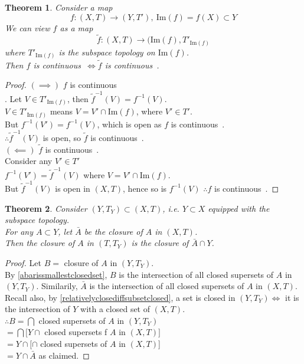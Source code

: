 \documentclass{article}
\newcommand{\cts}{continuous\ }
\newcommand{\im}[1]{\mathrm{Im}\left(#1\right)}
\newtheorem{stheorem}{Theorem}[theorem]
\theoremstyle{remark}
\theoremstyle{example}
\theoremstyle{examples}
\begin{document}
	\begin{stheorem}
		Consider a map \[f:(X,T) \to (Y,T'),\ \im f = f(X) \subset Y \]
		We can view $f$ as a map \[\tilde{f}:(X,T) \to (\im{f}, T'_{\im{f}}\] where $T'_{\im{f}}$ is the subspace topology on $\im{f}$.\\
		Then $f$ is \cts $\iff \tilde{f}$ is \cts.
	\end{stheorem}
	\begin{proof}
		$(\implies)$ $f$ is \cts\\.
		Let $V \in T'_{\im{f}}$, then $\tilde{f}^{-1}(V) = f^{-1}(V)$.\\
		$V \in T'_{\im{f}}$ means $V=V' \cap \im{f}$, where $V' \in T'$.\\
		But $f^{-1}(V')=f^{-1}(V)$, which is open as $f$ is \cts.\\
		$\therefore \tilde{f}^{-1}(V)$ is open, so $\tilde{f}$ is \cts.\\
		$(\impliedby)$ $\tilde{f}$ is \cts.\\
		Consider any $V' \in T'$\\
		$f^{-1}(V')=\tilde{f}^{-1}(V)$ where $V=V' \cap \im{f}$.\\
		But $\tilde{f}^{-1}(V)$ is open in $(X,T)$, hence so is $f^{-1}(V)$ $\therefore f$ is \cts.
	\end{proof}

	\begin{stheorem}
		Consider $(Y,T_Y) \subset (X,T)$, i.e. $Y \subset X$ equipped with the subspace topology.\\
		For any $A \subset Y$, let $\bar{A}$ be the closure of $A$ in $(X,T)$.\\
		Then the closure of $A$ in $(T,T_Y)$ is the closure of $\bar{A} \cap Y$.
	\end{stheorem}
	\begin{proof}
		Let $B=$ closure of $A$ in $(Y,T_Y)$.\\
		By \ref{abarissmallestclosedset}, $B$ is the intersection of all closed supersets of $A$ in $(Y,T_Y)$. Similarily, $\bar{A}$ is the intersection of all closed supersets of $A$ in $(X,T)$.\\
		Recall also, by \ref{relativelyclosediffsubsetclosed}, a set is closed in $(Y,T_Y) \iff$ it is the intersection of $Y$ with a closed set of $(X,T)$.\\
		$\therefore B = \bigcap$ closed supersets of $A$ in $(Y,T_Y)$\\
		$=\bigcap [Y \cap$ closed supersets f $A$ in $(X,T)]$\\
		$=Y \cap [\cap$ closed supersets of $A$ in $(X,T)$]\\
		$=Y \cap \bar{A}$ as claimed.
	\end{proof}
\end{document}
